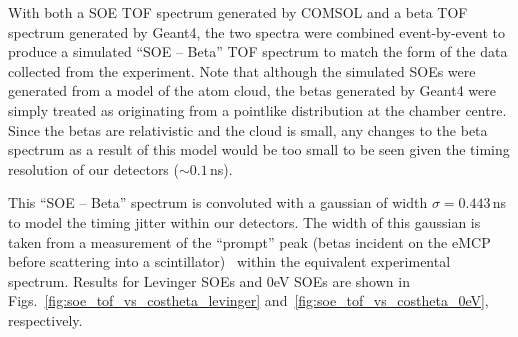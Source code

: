 With both a SOE TOF spectrum generated by COMSOL and a beta TOF spectrum generated by Geant4, the two spectra were combined event-by-event to produce a simulated ``SOE -- Beta'' TOF spectrum to match the form of the data collected from the experiment. Note that although the simulated SOEs were generated from a model of the atom cloud, the betas generated by Geant4 were simply treated as originating from a pointlike distribution at the chamber centre.  Since the betas are relativistic and the cloud is small, any changes to the beta spectrum as a result of this model would be too small to be seen given the timing resolution of our detectors ($\sim 0.1\,$ns).  

This ``SOE -- Beta'' spectrum is convoluted with a gaussian of width $\sigma=0.443\,$ns to model the timing jitter within our detectors.  The width of this gaussian is taken from a measurement of the ``prompt'' peak (betas incident on the eMCP before scattering into a scintillator)~ within the equivalent experimental spectrum.  Results for Levinger SOEs and 0eV SOEs are shown in Figs.~\ref{fig:soe_tof_vs_costheta_levinger} and~\ref{fig:soe_tof_vs_costheta_0eV}, respectively.


